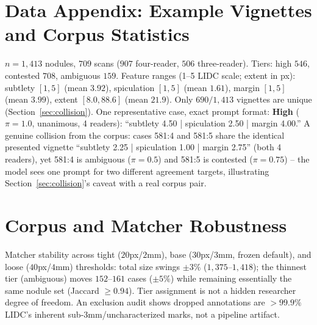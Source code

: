 \documentclass[letterpaper]{article} %
\begin{document}
\appendix
\section{Data Appendix: Example Vignettes and Corpus Statistics}
\label{app:data}
$n{=}1{,}413$ nodules, $709$ scans ($907$ four-reader, $506$ three-reader).
Tiers: high $546$, contested $708$, ambiguous $159$. Feature ranges
(1--5 LIDC scale; extent in px): subtlety $[1,5]$ (mean $3.92$), spiculation
$[1,5]$ (mean $1.61$), margin $[1,5]$ (mean $3.99$), extent $[8.0,88.6]$
(mean $21.9$). Only $690/1{,}413$ vignettes are unique
(Section~\ref{sec:collision}). One representative case, exact prompt
format: \textbf{High} ($\pi{=}1.0$, unanimous, 4 readers): ``subtlety 4.50 |
spiculation 2.50 | margin 4.00.'' A genuine collision from the corpus:
cases 581:4 and 581:5 share the identical presented vignette ``subtlety
2.25 | spiculation 1.00 | margin 2.75'' (both 4 readers), yet 581:4 is
ambiguous ($\pi{=}0.5$) and 581:5 is contested ($\pi{=}0.75$) -- the model
sees one prompt for two different agreement targets, illustrating
Section~\ref{sec:collision}'s caveat with a real corpus pair.

\section{Corpus and Matcher Robustness}
\label{app:matcher}
Matcher stability across tight ($20$px/$2$mm), base ($30$px/$3$mm, frozen
default), and loose ($40$px/$4$mm) thresholds: total size swings $\pm3\%$
($1{,}375$--$1{,}418$); the thinnest tier (ambiguous) moves $152$--$161$
cases ($\pm5\%$) while remaining essentially the same nodule set (Jaccard
$\geq0.94$). Tier assignment is not a hidden researcher degree of freedom.
An exclusion audit shows dropped annotations are $>99.9\%$ LIDC's inherent
sub-3mm/uncharacterized marks, not a pipeline artifact.
\end{document}
